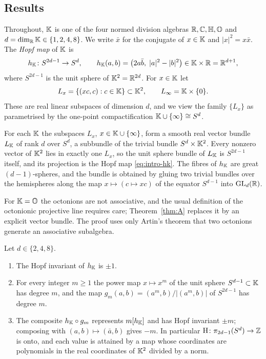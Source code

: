 \subsection{Results}

Throughout, $\mathbb{K}$ is one of the four normed division algebras $\mathbb{R},\mathbb{C},\mathbb{H},\mathbb{O}$ and $d=\dim_{\mathbb{R}}\mathbb{K}\in\{1,2,4,8\}$. We write $\bar x$ for the conjugate of $x\in\mathbb{K}$ and $|x|^2=x\bar x$. The \emph{Hopf map} of $\mathbb{K}$ is
\begin{equation}\label{eq:intro-hk}
h_{\mathbb{K}}\colon S^{2d-1}\to S^d,\qquad h_{\mathbb{K}}(a,b)=\bigl(2a\bar b,\;|a|^2-|b|^2\bigr)\in\mathbb{K}\times\mathbb{R}=\mathbb{R}^{d+1},
\end{equation}
where $S^{2d-1}$ is the unit sphere of $\mathbb{K}^2=\mathbb{R}^{2d}$. For $x\in\mathbb{K}$ let
\[
L_x=\{(xc,c):c\in\mathbb{K}\}\subset\mathbb{K}^2,\qquad L_\infty=\mathbb{K}\times\{0\}.
\]
These are real linear subspaces of dimension $d$, and we view the family $\{L_x\}$ as parametrised by the one-point compactification $\mathbb{K}\cup\{\infty\}\cong S^d$.

\begin{maintheorem}\label{thm:A}
For each $\mathbb{K}$ the subspaces $L_x$, $x\in\mathbb{K}\cup\{\infty\}$, form a smooth real vector bundle $L_{\mathbb{K}}$ of rank $d$ over $S^d$, a subbundle of the trivial bundle $S^d\times\mathbb{K}^2$. Every nonzero vector of $\mathbb{K}^2$ lies in exactly one $L_x$, so the unit sphere bundle of $L_{\mathbb{K}}$ is $S^{2d-1}$ itself, and its projection is the Hopf map \eqref{eq:intro-hk}. The fibres of $h_{\mathbb{K}}$ are great $(d-1)$-spheres, and the bundle is obtained by gluing two trivial bundles over the hemispheres along the map $x\mapsto(c\mapsto xc)$ of the equator $S^{d-1}$ into $\mathrm{GL}_d(\mathbb{R})$.
\end{maintheorem}

For $\mathbb{K}=\mathbb{O}$ the octonions are not associative, and the usual definition of the octonionic projective line requires care; Theorem~\ref{thm:A} replaces it by an explicit vector bundle. The proof uses only Artin's theorem that two octonions generate an associative subalgebra.

\begin{maintheorem}\label{thm:B}
Let $d\in\{2,4,8\}$.
\begin{enumerate}[label=\textup{(\roman*)}]
\item The Hopf invariant of $h_{\mathbb{K}}$ is $\pm1$.
\item For every integer $m\ge1$ the power map $x\mapsto x^m$ of the unit sphere $S^{d-1}\subset\mathbb{K}$ has degree $m$, and the map $g_m(a,b)=(a^m,b)/|(a^m,b)|$ of $S^{2d-1}$ has degree $m$.
\item The composite $h_{\mathbb{K}}\circ g_m$ represents $m[h_{\mathbb{K}}]$ and has Hopf invariant $\pm m$; composing with $(a,b)\mapsto(\bar a,b)$ gives $-m$. In particular $\mathrm{H}\colon\pi_{2d-1}(S^d)\to\mathbb{Z}$ is onto, and each value is attained by a map whose coordinates are polynomials in the real coordinates of $\mathbb{K}^2$ divided by a norm.
\end{enumerate}
\end{maintheorem}

